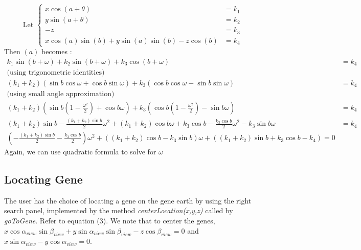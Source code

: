\documentclass[]{article}
\begin{document}
\begin{enumerate}
 
\[ \text{Let } 
\begin{cases}
x \cos (a + \theta) &= k_1\\
y \sin (a + \theta) &= k_2 \\
-z &= k_3 \\
x \cos (a) \sin (b) + y \sin (a) \sin (b) - z \cos (b) &= k_4
\end{cases}
\]
Then $(a)$ becomes : 
\begin{equation*}
\begin{split}
k_1\sin(b + \omega)+k_2\sin(b + \omega) + k_3\cos (b + \omega) &= k_4\\
\text{(using trigonometric identities)}\\
(k_1+k_2)(\sin b \cos \omega + \cos b \sin \omega)+ k_3(\cos b \cos \omega - \sin b \sin \omega)&= k_4\\
\text{(using small angle approximation)}\\
(k_1+k_2)(\sin b (1-\frac{\omega^2}{2}) + \cos b \omega)+ k_3(\cos b (1-\frac{\omega^2}{2}) - \sin b \omega) &= k_4\\
(k_1+k_2)\sin b - \frac{(k_1+k_2)\sin b}{2}\omega^2 + (k_1+k_2) \cos b \omega + k_3 \cos b - \frac{k_3\cos b }{2}\omega^2 - k_3\sin b \omega &= k_4 \\
(- \frac{(k_1+k_2)\sin b}{2} - \frac{k_3\cos b }{2})\omega^2 + ((k_1+k_2) \cos b - k_3\sin b)\omega + ((k_1+k_2)\sin b + k_3 \cos b - k_4)=0
\end{split}
\end{equation*}
Again, we can use quadratic formula to solve for $\omega$

\end{enumerate}

\subsection{Locating Gene}

The user has the choice of locating a gene on the gene earth by using the right search panel, implemented by the method \textit{centerLocation(x,y,z)} called by \textit{goToGene}. Refer to equation (3). We note that to center the genes, $x\cos \alpha_{view} \sin \beta_{view} + y\sin \alpha_{view} \sin \beta_{view} -z\cos \beta_{view}=0$ and $x \sin \alpha_{view} -y\cos \alpha_{view} = 0$. 
\end{document}
